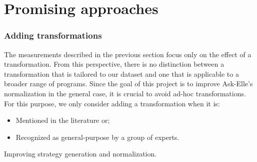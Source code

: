 \chapter{Promising approaches}

\subsection{Adding transformations}

The measurements described in the previous section focus only on the effect of a transformation. From this perspective, there is no distinction between a transformation that is tailored to our dataset and one that is applicable to a broader range of programs. Since the goal of this project is to improve Ask-Elle's normalization in the general case, it is crucial to avoid ad-hoc transformations. For this purpose, we only consider adding a transformation when it is:

\begin{itemize}
    \item Mentioned in the literature or;
    \item Recognized as general-purpose by a group of experts.
\end{itemize}

Improving strategy generation and normalization.



